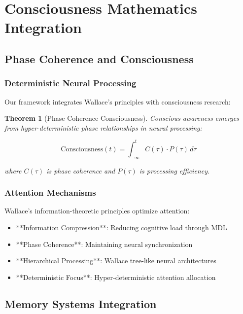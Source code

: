 \documentclass[12pt]{article}
\newtheorem{theorem}{Theorem}
\begin{document}
\section{Consciousness Mathematics Integration}

\subsection{Phase Coherence and Consciousness}

\subsubsection{Deterministic Neural Processing}

Our framework integrates Wallace's principles with consciousness research:

\begin{theorem}[Phase Coherence Consciousness]
Conscious awareness emerges from hyper-deterministic phase relationships in neural processing:

\begin{equation}
\text{Consciousness}(t) = \int_{-\infty}^{t} C(\tau) \cdot P(\tau) \, d\tau
\end{equation}

where $C(\tau)$ is phase coherence and $P(\tau)$ is processing efficiency.
\end{theorem}

\subsubsection{Attention Mechanisms}

Wallace's information-theoretic principles optimize attention:

\begin{itemize}
    \item **Information Compression**: Reducing cognitive load through MDL
    \item **Phase Coherence**: Maintaining neural synchronization
    \item **Hierarchical Processing**: Wallace tree-like neural architectures
    \item **Deterministic Focus**: Hyper-deterministic attention allocation
\end{itemize}

\subsection{Memory Systems Integration}
\end{document}
